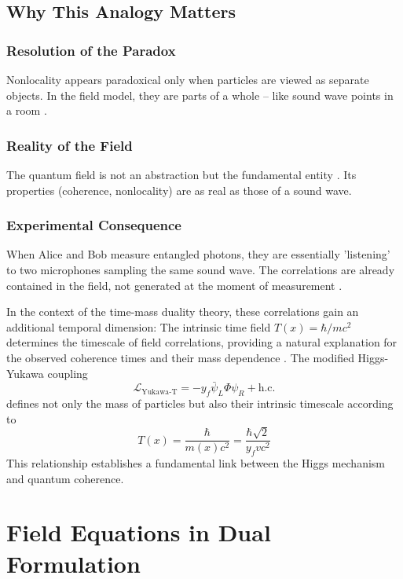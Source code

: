 \documentclass[12pt,a4paper]{article}
\newcommand{\Tfield}{T(x)}
\begin{document}
	\subsection{Why This Analogy Matters}
	\subsubsection{Resolution of the Paradox}
	Nonlocality appears paradoxical only when particles are viewed as separate objects. In the field model, they are parts of a whole – like sound wave points in a room \cite{Bohm1980}\relax.
	
	\subsubsection{Reality of the Field}
	The quantum field is not an abstraction but the fundamental entity \cite{Weinberg1995}\relax. Its properties (coherence, nonlocality) are as real as those of a sound wave.
	
	\subsubsection{Experimental Consequence}
	When Alice and Bob measure entangled photons, they are essentially 'listening' to two microphones sampling the same sound wave. The correlations are already contained in the field, not generated at the moment of measurement \cite{Zeilinger2010}\relax.
	
	In the context of the time-mass duality theory, these correlations gain an additional temporal dimension: The intrinsic time field \(\Tfield = \hbar/mc^2\) determines the timescale of field correlations, providing a natural explanation for the observed coherence times and their mass dependence \cite{Pascher2024}\relax. The modified Higgs-Yukawa coupling
	\begin{equation}
		\mathcal{L}_{\text{Yukawa-T}} = -y_f \bar{\psi}_L \Phi \psi_R + \text{h.c.}
	\end{equation}
	defines not only the mass of particles but also their intrinsic timescale according to
	\begin{equation}
		\Tfield = \frac{\hbar}{m(x) c^2} = \frac{\hbar \sqrt{2}}{y_f v c^2}
	\end{equation}
	This relationship establishes a fundamental link between the Higgs mechanism and quantum coherence.
	
	\section{Field Equations in Dual Formulation}
\end{document}
